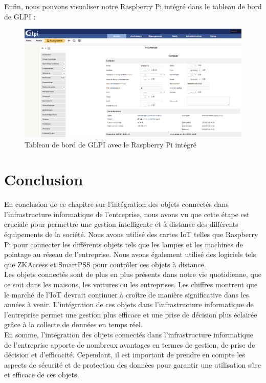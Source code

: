 Enfin, nous pouvons visualiser notre Raspberry Pi intégré dans le tableau de bord de GLPI :

\begin{figure}[H]
\centering
\includegraphics[width=15cm]{Images/RASPBERRYPIGLPI.png}
\caption{Tableau de bord de GLPI avec le Raspberry Pi intégré}
\label{fig:glpi-raspberry}
\end{figure}

\section{Conclusion}


En conclusion de ce chapitre sur l'intégration des objets connectés dans l'infrastructure informatique de l'entreprise, nous avons vu que cette étape est cruciale pour permettre une gestion intelligente et à distance des différents équipements de la société. Nous avons utilisé des cartes IoT telles que Raspberry Pi pour connecter les différents objets tels que les lampes et les machines de pointage au réseau de l'entreprise. Nous avons également utilisé des logiciels tels que ZKAccess et SmartPSS pour contrôler ces objets à distance. \\

Les objets connectés sont de plus en plus présents dans notre vie quotidienne, que ce soit dans les maisons, les voitures ou les entreprises. Les chiffres montrent que le marché de l'IoT devrait continuer à croître de manière significative dans les années à venir. L'intégration de ces objets dans l'infrastructure informatique de l'entreprise permet une gestion plus efficace et une prise de décision plus éclairée grâce à la collecte de données en temps réel. \\

En somme, l'intégration des objets connectés dans l'infrastructure informatique de l'entreprise apporte de nombreux avantages en termes de gestion, de prise de décision et d'efficacité. Cependant, il est important de prendre en compte les aspects de sécurité et de protection des données pour garantir une utilisation sûre et efficace de ces objets. \\




